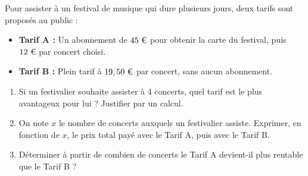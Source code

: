 \begin{exo}
	Pour assister à un festival de musique qui dure plusieurs jours, deux tarifs sont proposés au public :
	\begin{itemize}
		\item \textbf{Tarif A :} Un abonnement de $45\text{ \texteuro}$ pour obtenir la carte du festival, puis $12\text{ \texteuro}$ par concert choisi.
		\item \textbf{Tarif B :} Plein tarif à $19,50\text{ \texteuro}$ par concert, sans aucun abonnement.
	\end{itemize}
	\begin{enumerate}
		\item Si un festivalier souhaite assister à 4 concerts, quel tarif est le plus avantageux pour lui ? Justifier par un calcul.
		\item On note $x$ le nombre de concerts auxquels un festivalier assiste. Exprimer, en fonction de $x$, le prix total payé avec le Tarif A, puis avec le Tarif B.
		\item Déterminer à partir de combien de concerts le Tarif A devient-il plus rentable que le Tarif B ?
	\end{enumerate}
\end{exo}
